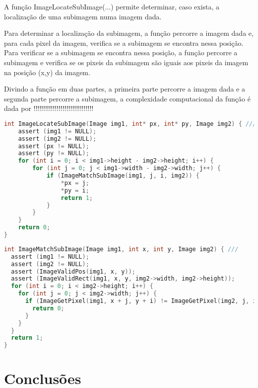 \documentclass{report}
\begin{document}
A função ImageLocateSubImage(...) permite determinar, caso exista, a localização de uma subimagem numa imagem dada.
\par
Para determinar a localização da subimagem, a função percorre a imagem dada e, para cada pixel da imagem, verifica se a subimagem se encontra nessa posição. 
Para verificar se a subimagem se encontra nessa posição, a função percorre a subimagem e verifica se os pixeis da subimagem são iguais aos pixeis da imagem na posição (x,y) da imagem.
\par
Divindo a função em duas partes, a primeira parte percorre a imagem dada e a segunda parte percorre a subimagem, a complexidade computacional da função é dada por !!!!!!!!!!!!!!!!!!!!!!!!!!!!!!!
\par
\begingroup
\begin{lstlisting}[language=C]
int ImageLocateSubImage(Image img1, int* px, int* py, Image img2) { ///
    assert (img1 != NULL);
    assert (img2 != NULL);
    assert (px != NULL);
    assert (py != NULL);
    for (int i = 0; i < img1->height - img2->height; i++) {
        for (int j = 0; j < img1->width - img2->width; j++) {
            if (ImageMatchSubImage(img1, j, i, img2)) {
                *px = j;
                *py = i;
                return 1;
            }
        }
    }
    return 0;
}
\end{lstlisting}
    
\begin{lstlisting}[language=C]
int ImageMatchSubImage(Image img1, int x, int y, Image img2) { ///
  assert (img1 != NULL);
  assert (img2 != NULL);
  assert (ImageValidPos(img1, x, y));
  assert (ImageValidRect(img1, x, y, img2->width, img2->height));
  for (int i = 0; i < img2->height; i++) {
    for (int j = 0; j < img2->width; j++) {
      if (ImageGetPixel(img1, x + j, y + i) != ImageGetPixel(img2, j, i)) {
        return 0;
      }
    }
  }
  return 1;
}
\end{lstlisting}
\endgroup


\chapter{Conclusões}





\printbibliography
\end{document}
